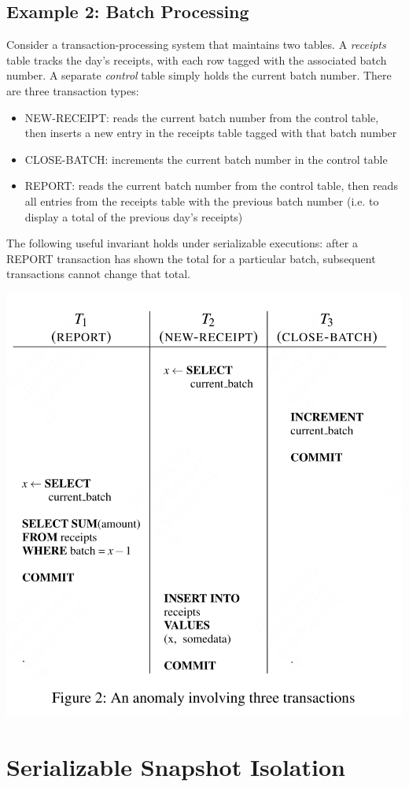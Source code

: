 \documentclass[11pt]{article}
\begin{document}
\subsection{Example 2: Batch Processing}
\label{sec:org713261f}
Consider a transaction-processing system that maintains two tables. A \emph{receipts} table tracks the day’s
receipts, with each row tagged with the associated batch number. A separate \emph{control} table simply holds
the current batch number. There are three transaction types:
\begin{itemize}
\item NEW-RECEIPT: reads the current batch number from the control table, then inserts a new entry in the
receipts table tagged with that batch number
\item CLOSE-BATCH: increments the current batch number in the control table
\item REPORT: reads the current batch number from the control table, then reads all entries from the
receipts table with the previous batch number (i.e. to display a total of the previous day’s
receipts)
\end{itemize}


The following useful invariant holds under serializable executions: after a REPORT transaction has
shown the total for a particular batch, subsequent transactions cannot change that total.
\begin{center}
\includegraphics[width=.5\textwidth]{../../images/papers/74.png}
\label{2}
\end{center}
\section{Serializable Snapshot Isolation}
\label{sec:org911e8e3}
\end{document}
